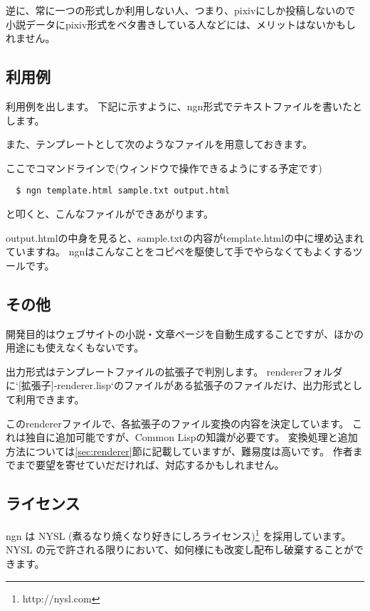 \documentclass[a4j]{jsarticle}
\begin{document}
逆に、常に一つの形式しか利用しない人、つまり、pixivにしか投稿しないので小説データにpixiv形式をベタ書きしている人などには、メリットはないかもしれません。


\subsection{利用例}
\label{subsec:example}

利用例を出します。
下記に示すように、ngn形式でテキストファイルを書いたとします。



また、テンプレートとして次のようなファイルを用意しておきます。



ここでコマンドラインで(ウィンドウで操作できるようにする予定です)

\verb|  $ ngn template.html sample.txt output.html|

と叩くと、こんなファイルができあがります。



output.htmlの中身を見ると、sample.txtの内容がtemplate.htmlの中に埋め込まれていますね。
ngnはこんなことをコピペを駆使して手でやらなくてもよくするツールです。


\subsection{その他}

開発目的はウェブサイトの小説・文章ページを自動生成することですが、ほかの用途にも使えなくもないです。

出力形式はテンプレートファイルの拡張子で判別します。
rendererフォルダに`[拡張子]-renderer.lisp`のファイルがある拡張子のファイルだけ、出力形式として利用できます。

このrendererファイルで、各拡張子のファイル変換の内容を決定しています。
これは独自に追加可能ですが、Common Lispの知識が必要です。
変換処理と追加方法については\ref{sec:renderer}節に記載していますが、難易度は高いです。
作者までまで要望を寄せていだだければ、対応するかもしれません。


\subsection{ライセンス}

ngn は NYSL (煮るなり焼くなり好きにしろライセンス)\footnote{http://nysl.com} を採用しています。
NYSL の元で許される限りにおいて、如何様にも改変し配布し破棄することができます。
\end{document}
